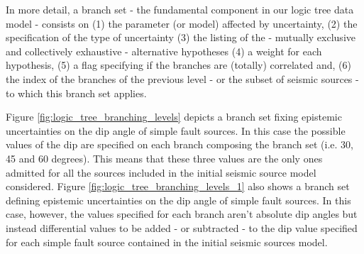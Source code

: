 %
In more detail, a branch set - the fundamental component in our logic tree data 
model - consists on (1) the parameter (or model) affected 
by uncertainty, (2) the specification of the type of uncertainty (3) the 
listing of the - mutually exclusive and collectively exhaustive 
- alternative hypotheses (4) a weight for each hypothesis, 
(5) a flag specifying if the branches are (totally) correlated and, (6) the 
index of the branches of the previous level - or the subset of seismic 
sources - to which this branch set applies.

Figure \ref{fig:logic_tree_branching_levels} depicts a branch 
set fixing epistemic uncertainties on the dip angle of simple 
fault sources. In this case the possible values of the dip are specified
on each branch composing the branch set (i.e. 30, 45 and 60 degrees). This 
means that these three values are the only ones admitted for all the sources 
included in the initial seismic source model considered. 
%
Figure \ref{fig:logic_tree_branching_levels_1} also shows a branch
set defining epistemic uncertainties on the dip angle 
of simple fault sources. In this case, however, the values specified for each 
branch aren't absolute dip angles but instead differential values to be added - 
or subtracted - to the dip value specified for each simple fault source 
contained in the initial seismic sources model.

